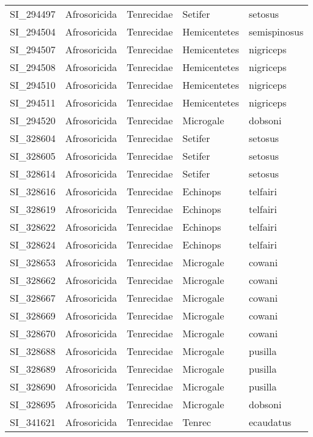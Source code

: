 \begin{longtable}{|l|l|l|l|l|}
    SI\_294497 & Afrosoricida & Tenrecidae & Setifer & setosus \\
    SI\_294504 & Afrosoricida & Tenrecidae & Hemicentetes & semispinosus \\
    SI\_294507 & Afrosoricida & Tenrecidae & Hemicentetes & nigriceps \\
    SI\_294508 & Afrosoricida & Tenrecidae & Hemicentetes & nigriceps \\
    SI\_294510 & Afrosoricida & Tenrecidae & Hemicentetes & nigriceps \\
    SI\_294511 & Afrosoricida & Tenrecidae & Hemicentetes & nigriceps \\
    SI\_294520 & Afrosoricida & Tenrecidae & Microgale & dobsoni \\
    SI\_328604 & Afrosoricida & Tenrecidae & Setifer & setosus \\
    SI\_328605 & Afrosoricida & Tenrecidae & Setifer & setosus \\
    SI\_328614 & Afrosoricida & Tenrecidae & Setifer & setosus \\
    SI\_328616 & Afrosoricida & Tenrecidae & Echinops & telfairi \\
    SI\_328619 & Afrosoricida & Tenrecidae & Echinops & telfairi \\
    SI\_328622 & Afrosoricida & Tenrecidae & Echinops & telfairi \\
    SI\_328624 & Afrosoricida & Tenrecidae & Echinops & telfairi \\
    SI\_328653 & Afrosoricida & Tenrecidae & Microgale & cowani \\
    SI\_328662 & Afrosoricida & Tenrecidae & Microgale & cowani \\
    SI\_328667 & Afrosoricida & Tenrecidae & Microgale & cowani \\
    SI\_328669 & Afrosoricida & Tenrecidae & Microgale & cowani \\
    SI\_328670 & Afrosoricida & Tenrecidae & Microgale & cowani \\
    SI\_328688 & Afrosoricida & Tenrecidae & Microgale & pusilla \\
    SI\_328689 & Afrosoricida & Tenrecidae & Microgale & pusilla \\
    SI\_328690 & Afrosoricida & Tenrecidae & Microgale & pusilla \\
    SI\_328695 & Afrosoricida & Tenrecidae & Microgale & dobsoni \\
    SI\_341621 & Afrosoricida & Tenrecidae & Tenrec & ecaudatus \\

\end{longtable}
